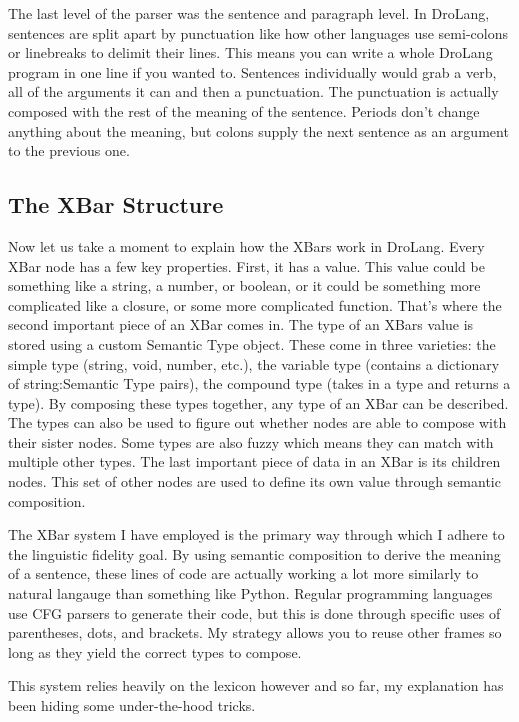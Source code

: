 \documentclass[titlepage]{article}
\newcommand{\langName}{DroLang}
\begin{document}
The last level of the parser was the sentence and paragraph level. In \langName{}, sentences are split apart by punctuation like how other languages use semi-colons or linebreaks to delimit their lines. This means you can write a whole \langName{} program in one line if you wanted to. Sentences individually would grab a verb, all of the arguments it can and then a punctuation. The punctuation is actually composed with the rest of the meaning of the sentence. Periods don't change anything about the meaning, but colons supply the next sentence as an argument to the previous one.

\subsection*{The XBar Structure}
Now let us take a moment to explain how the XBars work in \langName{}. Every XBar node has a few key properties. First, it has a value. This value could be something like a string, a number, or boolean, or it could be something more complicated like a closure, or some more complicated function. That's where the second important piece of an XBar comes in. The type of an XBars value is stored using a custom Semantic Type object. These come in three varieties: the simple type (string, void, number, etc.), the variable type (contains a dictionary of string:Semantic Type pairs), the compound type (takes in a type and returns a type). By composing these types together, any type of an XBar can be described. The types can also be used to figure out whether nodes are able to compose with their sister nodes. Some types are also fuzzy which means they can match with multiple other types. The last important piece of data in an XBar is its children nodes. This set of other nodes are used to define its own value through semantic composition.

The XBar system I have employed is the primary way through which I adhere to the linguistic fidelity goal. By using semantic composition to derive the meaning of a sentence, these lines of code are actually working a lot more similarly to natural langauge than something like Python. Regular programming languages use CFG parsers to generate their code, but this is done through specific uses of parentheses, dots, and brackets. My strategy allows you to reuse other frames so long as they yield the correct types to compose.

This system relies heavily on the lexicon however and so far, my explanation has been hiding some under-the-hood tricks.
\end{document}
